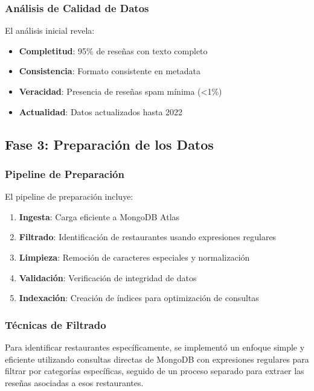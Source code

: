 \documentclass[12pt,a4paper,twoside,openany]{book}
\begin{document}
\subsubsection{Análisis de Calidad de Datos}

El análisis inicial revela:
\begin{itemize}
    \item \textbf{Completitud}: 95\% de reseñas con texto completo
    \item \textbf{Consistencia}: Formato consistente en metadata
    \item \textbf{Veracidad}: Presencia de reseñas spam mínima (<1\%)
    \item \textbf{Actualidad}: Datos actualizados hasta 2022
\end{itemize}

\subsection{Fase 3: Preparación de los Datos}

\subsubsection{Pipeline de Preparación}

El pipeline de preparación incluye:

\begin{enumerate}
    \item \textbf{Ingesta}: Carga eficiente a MongoDB Atlas
    \item \textbf{Filtrado}: Identificación de restaurantes usando expresiones regulares
    \item \textbf{Limpieza}: Remoción de caracteres especiales y normalización
    \item \textbf{Validación}: Verificación de integridad de datos
    \item \textbf{Indexación}: Creación de índices para optimización de consultas
\end{enumerate}

\subsubsection{Técnicas de Filtrado}

Para identificar restaurantes específicamente, se implementó un enfoque simple y eficiente utilizando consultas directas de MongoDB con expresiones regulares para filtrar por categorías específicas, seguido de un proceso separado para extraer las reseñas asociadas a esos restaurantes.
\end{document}
